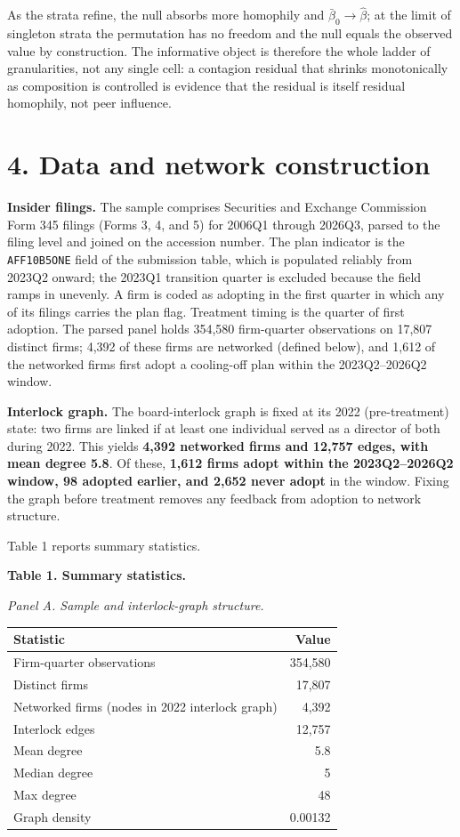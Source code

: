 \documentclass[
  a4paper,
]{article}
\begin{document}
As the strata refine, the null absorbs more homophily and
\(\bar\beta_0 \to \hat\beta\); at the limit of singleton strata the
permutation has no freedom and the null equals the observed value by
construction. The informative object is therefore the whole ladder of
granularities, not any single cell: a contagion residual that shrinks
monotonically as composition is controlled is evidence that the residual
is itself residual homophily, not peer influence.

\section{4. Data and network
construction}\label{data-and-network-construction}

\textbf{Insider filings.} The sample comprises Securities and Exchange
Commission Form 345 filings (Forms 3, 4, and 5) for 2006Q1 through
2026Q3, parsed to the filing level and joined on the accession number.
The plan indicator is the \texttt{AFF10B5ONE} field of the submission
table, which is populated reliably from 2023Q2 onward; the 2023Q1
transition quarter is excluded because the field ramps in unevenly. A
firm is coded as adopting in the first quarter in which any of its
filings carries the plan flag. Treatment timing is the quarter of first
adoption. The parsed panel holds 354,580 firm-quarter observations on
17,807 distinct firms; 4,392 of these firms are networked (defined
below), and 1,612 of the networked firms first adopt a cooling-off plan
within the 2023Q2--2026Q2 window.

\textbf{Interlock graph.} The board-interlock graph is fixed at its 2022
(pre-treatment) state: two firms are linked if at least one individual
served as a director of both during 2022. This yields \textbf{4,392
networked firms and 12,757 edges, with mean degree 5.8}. Of these,
\textbf{1,612 firms adopt within the 2023Q2--2026Q2 window, 98 adopted
earlier, and 2,652 never adopt} in the window. Fixing the graph before
treatment removes any feedback from adoption to network structure.

Table 1 reports summary statistics.

\textbf{Table 1. Summary statistics.}

\emph{Panel A. Sample and interlock-graph structure.}

\begin{longtable}[]{@{}lr@{}}
\toprule\noalign{}
Statistic & Value \\
\midrule\noalign{}
\endhead
\bottomrule\noalign{}
\endlastfoot
Firm-quarter observations & 354,580 \\
Distinct firms & 17,807 \\
Networked firms (nodes in 2022 interlock graph) & 4,392 \\
Interlock edges & 12,757 \\
Mean degree & 5.8 \\
Median degree & 5 \\
Max degree & 48 \\
Graph density & 0.00132 \\
\end{longtable}
\end{document}
